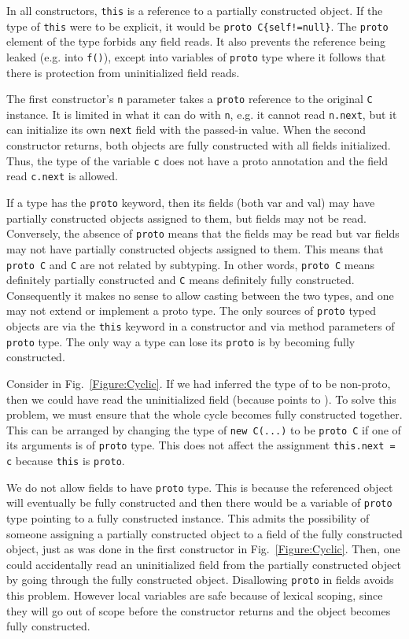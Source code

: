 In all constructors, \texttt{this} is a reference to a partially
    constructed object.
If the type of \texttt{this} were to be explicit, it would
be \texttt{proto C\{self!=null\}}.  The \texttt{proto} element of the type
forbids any field reads.  It also prevents the reference being leaked (e.g.
into \texttt{f()}), except into variables of \texttt{proto} type where it
follows that there is protection from uninitialized field reads.

The first constructor's \texttt{n} parameter takes a \texttt{proto} reference
to the original \texttt{C} instance.  It is limited in what it can do with
\texttt{n}, e.g. it cannot read \texttt{n.next}, but it can initialize its own
\texttt{next} field with the passed-in value.
When the second constructor returns, both objects are fully constructed with
all fields initialized.  Thus, the type of the variable \texttt{c} does not
have a proto annotation and the field read \texttt{c.next} is allowed.

If a type has the \texttt{proto} keyword, then its fields (both var and val)
may have partially constructed objects assigned to them, but fields may not be
read.  Conversely, the absence of \texttt{proto} means that the fields may be
read but var fields may not have partially constructed objects assigned to them.
This means that \texttt{proto C} and \texttt{C} are not related by subtyping.
In other words, \texttt{proto C} means definitely partially constructed and
\texttt{C} means definitely fully constructed.  Consequently it makes no sense
to allow casting between the two types, and one may not extend or implement a
proto type.  The only sources of \texttt{proto} typed objects are via the
\texttt{this} keyword in a constructor and via method parameters of
\texttt{proto} type.  The only way a type can lose its \texttt{proto} is by
becoming fully constructed.

Consider  in Fig.~\ref{Figure:Cyclic}.
If we had inferred the type of  to be non-proto,
    then we could have read the uninitialized field  (because  points to ).
To solve this problem, we must ensure that the whole cycle becomes fully
constructed together.
This can be arranged by changing the type of \texttt{new
C(...)} to be \texttt{proto C} if one of its arguments is of \texttt{proto}
type.  This does not affect the assignment \texttt{this.next = c} because
\texttt{this} is \texttt{proto}.

We do not allow fields to have \texttt{proto} type.  This is because the
referenced object will eventually be fully constructed and then there would be
a variable of \texttt{proto} type pointing to a fully constructed instance.
This admits the possibility of someone assigning a partially constructed object
to a field of the fully constructed object, just as was done in the first
constructor in Fig.~\ref{Figure:Cyclic}.  Then, one could accidentally read an
uninitialized field from the partially constructed object by going through the
fully constructed object.  Disallowing \texttt{proto} in fields avoids this
problem.  However local variables are safe because of lexical scoping, since they
will go out of scope before the constructor returns and the object becomes
fully constructed.

